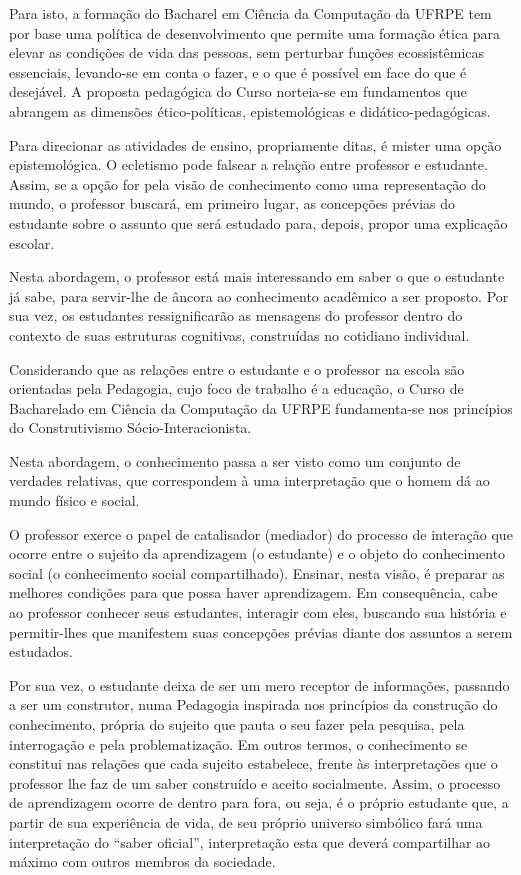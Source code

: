 \documentclass[
	12pt,				%
	openright,			%
  oneside,     %
	a4paper,			%
	english,			%
	french,				%
	spanish,			%
	brazil				%
	]{abntex2}
\begin{document}
Para isto, a formação do Bacharel em Ciência da Computação da UFRPE tem por base
uma política de desenvolvimento que permite uma formação ética para elevar as
condições de vida das pessoas, sem perturbar funções ecossistêmicas essenciais,
levando-se em conta o fazer, e o que é possível em face do que é desejável. A
proposta pedagógica do Curso norteia-se em fundamentos que abrangem as dimensões
ético-políticas, epistemológicas e didático-pedagógicas.

Para direcionar as atividades de ensino, propriamente ditas, é mister uma opção
epistemológica. O ecletismo pode falsear a relação entre professor e estudante.
Assim, se a opção for pela visão de conhecimento como uma representação do
mundo, o professor buscará, em primeiro lugar, as concepções prévias do
estudante sobre o assunto que será estudado para, depois, propor uma explicação
escolar.

Nesta abordagem, o professor está mais interessando em saber o que o estudante
já sabe, para servir-lhe de âncora ao conhecimento acadêmico a ser proposto. Por
sua vez, os estudantes ressignificarão as mensagens do professor dentro do
contexto de suas estruturas cognitivas, construídas no cotidiano individual.

Considerando que as relações entre o estudante e o professor na escola são
orientadas pela Pedagogia, cujo foco de trabalho é a educação, o Curso de
Bacharelado em Ciência da Computação da UFRPE fundamenta-se nos princípios do
Construtivismo Sócio-Interacionista.

Nesta abordagem, o conhecimento passa a ser visto como um conjunto de verdades
relativas, que correspondem à uma interpretação que o homem dá ao mundo físico e
social.

O professor exerce o papel de catalisador (mediador) do processo de interação
que ocorre entre o sujeito da aprendizagem (o estudante) e o objeto do
conhecimento social (o conhecimento social compartilhado). Ensinar, nesta visão,
é preparar as melhores condições para que possa haver aprendizagem. Em
consequência, cabe ao professor conhecer seus estudantes, interagir com eles,
buscando sua história e permitir-lhes que manifestem suas concepções prévias
diante dos assuntos a serem estudados.

Por sua vez, o estudante deixa de ser um mero receptor de informações, passando
a ser um construtor, numa Pedagogia inspirada nos princípios da construção do
conhecimento, própria do sujeito que pauta o seu fazer pela pesquisa, pela
interrogação e pela problematização. Em outros termos, o conhecimento se
constitui nas relações que cada sujeito estabelece, frente às interpretações que
o professor lhe faz de um saber construído e aceito socialmente. Assim, o
processo de aprendizagem ocorre de dentro para fora, ou seja, é o próprio
estudante que, a partir de sua experiência de vida, de seu próprio universo
simbólico fará uma interpretação do ``saber oficial'', interpretação esta que
deverá compartilhar ao máximo com outros membros da sociedade.
\end{document}

